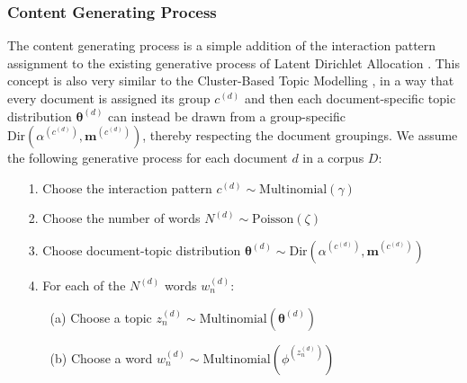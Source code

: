 \documentclass[a4paper]{article}
\begin{document}
\subsubsection{Content Generating Process} \label{subsubsec: Content Generating Process}
The content generating process is a simple addition of the interaction pattern assignment to the existing generative process of Latent Dirichlet Allocation \cite{Blei2003}. This concept is also very similar to the Cluster-Based Topic Modelling \citep{wallach2008structured}, in a way that every document is assigned its group $c^{(d)}$ and then each document-specific topic distribution $\boldsymbol{\theta}^{(d)}$ can instead be drawn from a group-specific $\mbox{Dir}(\alpha^{(c^{(d)})}, \boldsymbol{m}^{(c^{(d)})})$, thereby respecting the document groupings. We assume the following generative process for each document $d$ in a corpus $D$:
\begin{itemize}
	\item[1.] Choose the interaction pattern $c^{(d)} \sim \mbox{Multinomial}(\gamma)$
	\item[2.] Choose the number of words $N^{(d)} \sim \mbox{Poisson}(\zeta)$
	\item[3.] Choose document-topic distribution $\boldsymbol{\theta}^{(d)}\sim \mbox{Dir}(\alpha^{(c^{(d)})}, \boldsymbol{m}^{(c^{(d)})})$
	\item[4.] For each of the $N^{(d)}$ words $w_n^{(d)}$:
 		\begin{itemize}
 			\item[(a)] Choose a topic $z_n^{(d)} \sim \mbox{Multinomial}(\boldsymbol{\theta}^{(d)})$
 			\item[(b)] Choose a word $w_n^{(d)} \sim\mbox{Multinomial} (\phi^{(z_n^{(d)})})$
 		\end{itemize}
\end{itemize}
\end{document}
